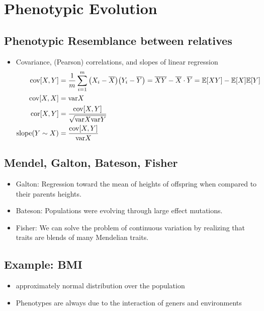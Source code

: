 \documentclass{article}
\newcommand{\vari}{\text{var}}
\newcommand{\cor}[1]{\text{cor}\qty[#1]}
\newcommand{\expec}[1]{\mathbb{E}\qty[#1]}
\newcommand{\cov}[1]{\text{cov}\qty[#1]}
\begin{document}
    \section{Phenotypic Evolution}
        \subsection{Phenotypic Resemblance between relatives}
            \begin{itemize}
                \item Covariance, (Pearson) correlations, and slopes of linear regression
                \begin{align*}
                    \cov{X,Y} &= \frac{1}{m}\sum_{i=1}^m\qty(X_i - \overline{X})\qty(Y_i - \overline{Y}) = \overline{XY} - \overline{X}\cdot\overline{Y} = \expec{XY} - \expec{X}\expec{Y} \\
                    \cov{X,X} &= \vari{X} \\
                    \cor{X,Y} &= \frac{\cov{X,Y}}{\sqrt{\vari{X}\vari{Y}}} \\
                    \text{slope}\qty(Y\sim X) &= \frac{\cov{X,Y}}{\vari{X}}
                \end{align*}
            \end{itemize}
        \subsection{Mendel, Galton, Bateson, Fisher}
            \begin{itemize}
                \item Galton: Regression toward the mean of heights of offspring when compared to their parents heights.
                \item Bateson: Populations were evolving through large effect mutations.
                \item Fisher: We can solve the problem of continuous variation by realizing that traits are blends of many Mendelian traits.
            \end{itemize}
        \subsection{Example: BMI}
            \begin{itemize}
                \item approximately normal distribution over the population
                \item Phenotypes are always due to the interaction of geners and environments
            \end{itemize}
\end{document}
